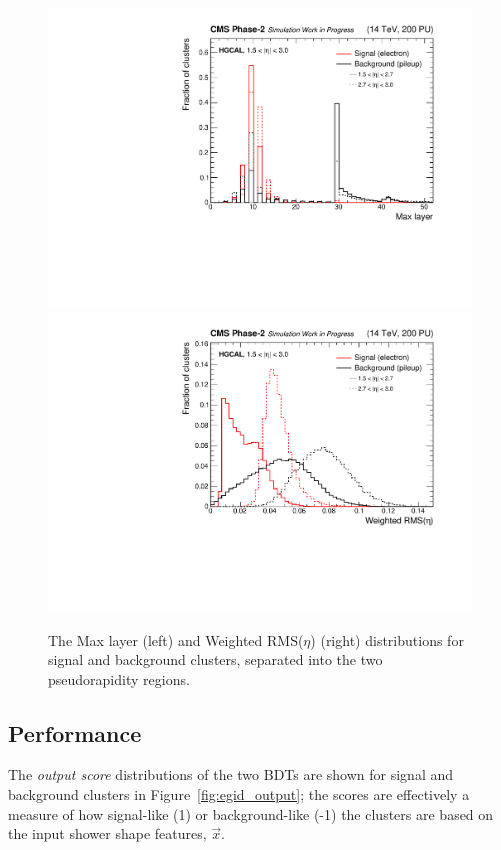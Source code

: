 \begin{figure}[htb!]
  \centering
  \includegraphics[width=.49\textwidth]{Figures/cms/egid/cl3d_maxlayer.pdf}
  \includegraphics[width=.49\textwidth]{Figures/cms/egid/cl3d_seetot.pdf}
  \caption[$e/\gamma$ identification input feature distributions]
  {
    The Max layer (left) and Weighted RMS($\eta$) (right) distributions for signal and background clusters, separated into the two pseudorapidity regions.
  }
  \label{fig:egid_features}
\end{figure}

\subsection{Performance}
The \textit{output score} distributions of the two BDTs are shown for signal and background clusters in Figure~\ref{fig:egid_output}; the scores are effectively a measure of how signal-like (1) or background-like (-1) the clusters are based on the input shower shape features, $\vec{x}$. 

